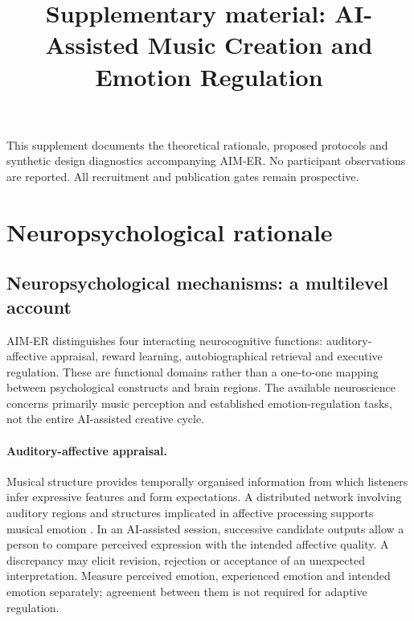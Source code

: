 \documentclass[11pt,a4paper]{article}
\title{Supplementary material: AI-Assisted Music Creation and Emotion Regulation}
\author{}
\date{}
\begin{document}
\maketitle
This supplement documents the theoretical rationale, proposed protocols and synthetic design diagnostics accompanying AIM-ER. No participant observations are reported. All recruitment and publication gates remain prospective.

\section{Neuropsychological rationale}
\subsection{Neuropsychological mechanisms: a multilevel account}
AIM-ER distinguishes four interacting neurocognitive functions: auditory-affective appraisal, reward learning, autobiographical retrieval and executive regulation. These are functional domains rather than a one-to-one mapping between psychological constructs and brain regions. The available neuroscience concerns primarily music perception and established emotion-regulation tasks, not the entire AI-assisted creative cycle.

\paragraph{Auditory-affective appraisal.} Musical structure provides temporally organised information from which listeners infer expressive features and form expectations. A distributed network involving auditory regions and structures implicated in affective processing supports musical emotion \citep{koelsch2014}. In an AI-assisted session, successive candidate outputs allow a person to compare perceived expression with the intended affective quality. A discrepancy may elicit revision, rejection or acceptance of an unexpected interpretation. Measure perceived emotion, experienced emotion and intended emotion separately; agreement between them is not required for adaptive regulation.
\end{document}
